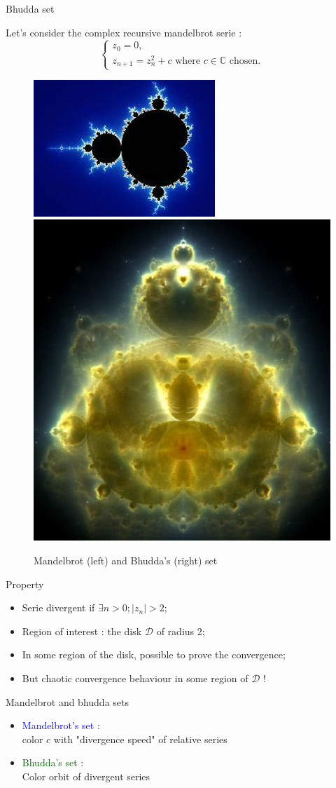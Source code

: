 \documentclass[compress,10pt,aspectratio=169]{beamer}
\begin{document}
\begin{frame}[fragile]{Bhudda set}
  \scriptsize
  \begin{multicols}{2}
  Let's consider the complex recursive mandelbrot serie :
  \[
  \left\{
  \begin{array}{l}
  z_{0}=0,\\
  z_{n+1} = z_{n}^{2} +c \mbox{ where } c\in\mathbb{C} \mbox{ chosen.}
  \end{array}\right.
  \]

  \begin{figure}[h]
    \includegraphics[width=0.3\linewidth]{../Images/mandelbrot.jpeg}
    \includegraphics[width=0.2\linewidth]{../Images/bhudda.jpg}
    \caption{\small Mandelbrot (left) and Bhudda's (right) set}
  \end{figure}
  \end{multicols}

  \begin{multicols}{2}
  \begin{block}{\small Property}
  \begin{itemize}
  \item Serie divergent if $\exists n>0; |z_{n}|>2$;
  \item Region of interest : the disk $\mathcal{D}$ of radius 2;
  \item In some region of the disk, possible to prove the convergence;
  \item But chaotic convergence behaviour in some region of $\mathcal{D}$ !
  \end{itemize}
  \end{block}

  \begin{exampleblock}{\small Mandelbrot and bhudda sets}
    \begin{itemize}
    \item \textcolor{blue}{Mandelbrot's set} : \\ color $c$ with  "divergence speed" of relative series
    \item \textcolor{DarkGreen}{Bhudda's set} : \\ Color  orbit of divergent series
    \end{itemize}
  \end{exampleblock}
  \end{multicols}
\end{frame}
\end{document}
